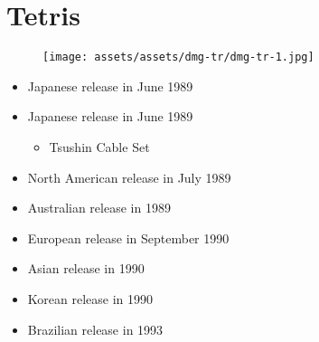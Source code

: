 \documentclass{book}
\begin{document}
\begingroup \chapter*{Tetris} \endgroup
\begin{figure}[H]
\vskip 4pt
\centering
\texttt{[image: assets/assets/dmg-tr/dmg-tr-1.jpg]}\end{figure}
\begin{itemize} [nosep]




\item Japanese release in June 1989







\item Japanese release in June 1989
\begin{itemize} [nosep]\item Tsushin Cable Set\end{itemize}\noindent






\item North American release in July 1989







\item Australian release in 1989







\item European release in September 1990







\item Asian release in 1990







\item Korean release in 1990







\item Brazilian release in 1993








\end{itemize}
\end{document}
